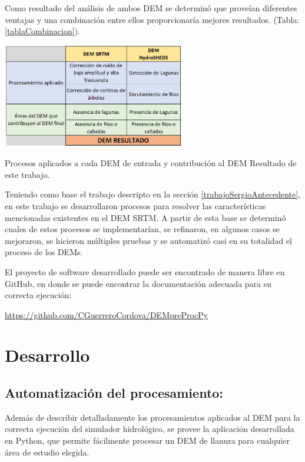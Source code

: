 \documentclass[10pt,a4paper, twoside]{report}
\begin{document}
Como resultado del análisis de ambos DEM se determinó que proveían diferentes ventajas y una combinación entre ellos proporcionaría mejores resultados. (Tabla: \ref{tablaCombinacion}).

\begin{table}[H]
   \centering      
   \includegraphics[width=0.6\textwidth]{imagenes/tablaCombinacion.jpg}
 \caption{Procesos aplicados a cada DEM de entrada y contribución al DEM Resultado de este trabajo.}
 \label{tablaCombinacion}
\end{table}

Teniendo como base el trabajo descripto en la sección \ref{trabajoSergioAntecedente}, en este trabajo se desarrollaron procesos para resolver las características mencionadas existentes en el DEM SRTM. A partir de esta base se determinó cuales de estos procesos se implementarían, se refinaron, en algunos casos se mejoraron, se hicieron múltiples pruebas y se automatizó casi en su totalidad el proceso de los DEMs.

El proyecto de software desarrollado puede ser encontrado de manera libre en GitHub, en donde se puede encontrar la documentación adecuada para su correcta ejecución: 

\hyperref[https://github.com/CGuerreroCordova/DEMpreProcPy]{https://github.com/CGuerreroCordova/DEMpreProcPy}

\section{Desarrollo}

\subsection{Automatización del procesamiento:} Además de describir detalladamente los procesamientos aplicados al DEM para la correcta ejecución del simulador hidrológico, se provee la aplicación desarrollada en Python, que permite fácilmente procesar un DEM de llanura para cualquier área de estudio elegida.
\end{document}

